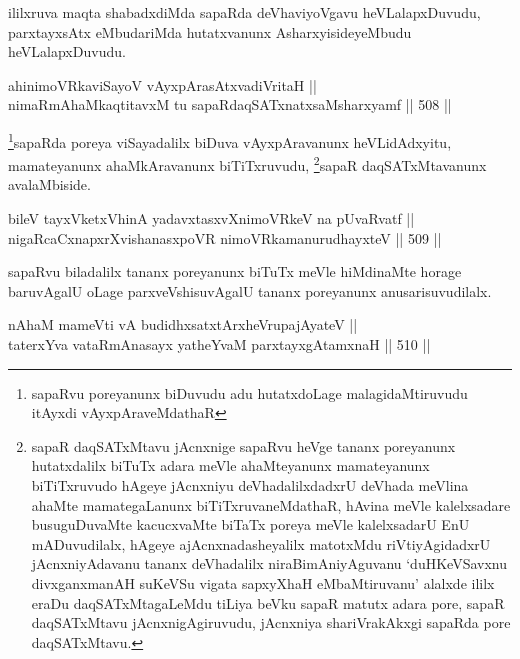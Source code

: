 \begin{artha}
ililxruva maqta shabadxdiMda sapaRda deVhaviyoVgavu heVLalapxDuvudu,
parxtayxsAtx eMbudariMda hutatxvanunx AsharxyisideyeMbudu
heVLalapxDuvudu.
\end{artha}

\begin{shl}
ahinimoVRkaviSayoV vAyxpArasAtxvadiVritaH || \\
nimaRmAhaMkaqtitavxM tu sapaRdaqSATxnatxsaMsharxyamf \hfill || 508 ||  
\end{shl}

\begin{artha}
\footnote{sapaRvu poreyanunx biDuvudu adu hutatxdoLage
malagidaMtiruvudu itAyxdi vAyxpAraveMdathaR}sapaRda poreya viSayadalilx biDuva vAyxpAravanunx
heVLidAdxyitu, mamateyanunx ahaMkAravanunx
biTiTxruvudu, \footnote{sapaR daqSATxMtavu jAcnxnige sapaRvu heVge
tananx poreyanunx hutatxdalilx biTuTx adara meVle ahaMteyanunx
mamateyanunx biTiTxruvudo hAgeye jAcnxniyu deVhadalilxdadxrU deVhada
meVlina ahaMte mamategaLanunx biTiTxruvaneMdathaR, hAvina meVle
kalelxsadare busuguDuvaMte kacucxvaMte biTaTx poreya meVle
kalelxsadarU EnU mADuvudilalx, hAgeye ajAcnxnadasheyalilx matotxMdu
riVtiyAgidadxrU jAcnxniyAdavanu tananx deVhadalilx
niraBimAniyAguvanu `duHKeVSavxnu divxganxmanAH suKeVSu vigata sapxyXhaH eMbaMtiruvanu' alalxde ililx eraDu daqSATxMtagaLeMdu
tiLiya beVku sapaR matutx adara pore, sapaR daqSATxMtavu
jAcnxnigAgiruvudu,  jAcnxniya shariVrakAkxgi sapaRda pore daqSATxMtavu.}sapaR daqSATxMtavanunx avalaMbiside.
\end{artha}

\begin{shl}
bileV tayxVketxV\s hinA yadavxtasxvXnimoVRkeV na pUvaRvatf || \\
nigaRcaCxnapxrXvishanasxpoVR nimoVRkamanurudhayxteV \hfill || 509 ||  
\end{shl}

\begin{artha}
sapaRvu biladalilx tananx poreyanunx biTuTx meVle hiMdinaMte horage
baruvAgalU oLage parxveVshisuvAgalU tananx poreyanunx
anusarisuvudilalx.
\end{artha}


\begin{shl}
nAhaM mameVti vA budidhxsatxtArxheVrupajAyateV || \\
taterxYva vataRmAnasayx yatheYvaM parxtayxgAtamxnaH \hfill || 510 ||  
\end{shl}

